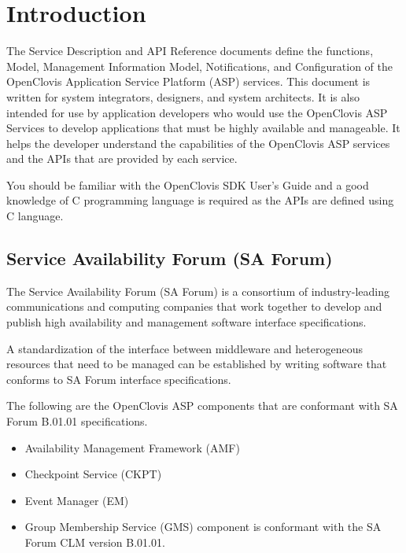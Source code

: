 \hypertarget{group__group2}{
\chapter{Introduction}
\label{group__group2}
}

\begin{flushleft}
The Service Description and API Reference documents define the functions, Model, Management Information Model,
Notifications, and Configuration
of the OpenClovis Application Service Platform (ASP) services. This document is written for system integrators, designers, and
system architects. It is also intended for use by application developers who would use the
OpenClovis ASP Services to develop applications that must be highly available and manageable. 
It helps the developer understand the capabilities of the OpenClovis ASP services and the APIs that are provided by each service.
\par
You should be familiar with the OpenClovis SDK User's Guide and a good knowledge of C programming language is required as the 
APIs are defined using C language.
\end{flushleft}



\section{Service Availability Forum (SA Forum)}
\begin{flushleft}
The Service Availability Forum (SA Forum) is a consortium of industry-leading communications and computing companies that work together
to develop and publish high availability and management software interface specifications.  
\par
A standardization of the interface between middleware and heterogeneous resources that need to be managed 
can be established by writing software that conforms to SA Forum interface specifications.
\par
The following are the OpenClovis ASP components that are conformant with SA Forum B.01.01 specifications.
\begin{itemize}
\item Availability Management Framework (AMF)
\item Checkpoint Service (CKPT)
\item Event Manager (EM)
\item Group Membership Service (GMS) component is conformant with the SA Forum CLM version B.01.01.
\end{itemize}
\end{flushleft}




